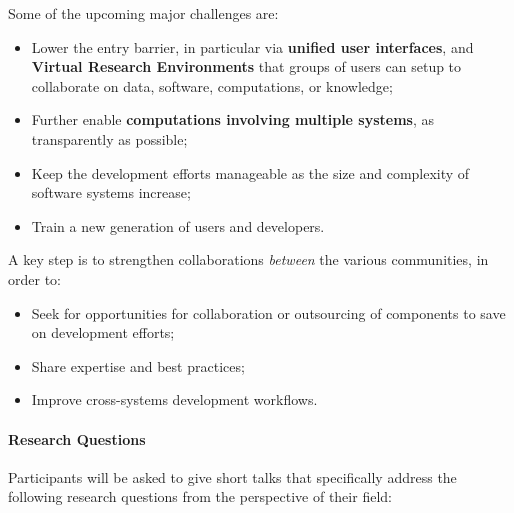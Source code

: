 Some of the upcoming major challenges are:
\begin{itemize}
\item Lower the entry barrier, in particular via \textbf{unified user
    interfaces}, and \textbf{Virtual Research Environments} that
  groups of users can setup to collaborate on data, software,
  computations, or knowledge;
\item Further enable \textbf{computations involving multiple systems},
  as transparently as possible;
\item Keep the development efforts manageable as the size and
  complexity of software systems increase;
\item Train a new generation of users and developers.
\end{itemize}

A key step is to strengthen collaborations \emph{between} the various
communities, in order to:
\begin{itemize}
\item Seek for opportunities for collaboration or outsourcing of
  components to save on development efforts;
\item Share expertise and best practices;
\item Improve cross-systems development workflows.
\end{itemize}

\paragraph{Research Questions}
Participants will be asked to give short talks that specifically address the following research questions from the perspective of their field:

